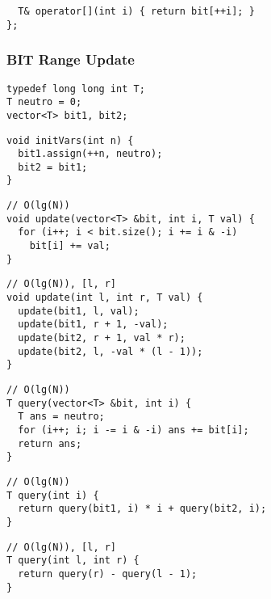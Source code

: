 \documentclass[twoside]{article}
\begin{document}
\begin{multicols*}{2}
\begin{verbatim}
  T& operator[](int i) { return bit[++i]; }
};
\end{verbatim}

\subsubsectionfont{\large\bfseries\sffamily\underline}
\subsubsection*{BIT Range Update}
\begin{verbatim}
typedef long long int T;
T neutro = 0;
vector<T> bit1, bit2;
\end{verbatim}
\vspace{-12pt}
\begin{verbatim}
void initVars(int n) {
  bit1.assign(++n, neutro);
  bit2 = bit1;
}
\end{verbatim}
\vspace{-12pt}
\begin{verbatim}
// O(lg(N))
void update(vector<T> &bit, int i, T val) {
  for (i++; i < bit.size(); i += i & -i)
    bit[i] += val;
}
\end{verbatim}
\vspace{-12pt}
\begin{verbatim}
// O(lg(N)), [l, r]
void update(int l, int r, T val) {
  update(bit1, l, val);
  update(bit1, r + 1, -val);
  update(bit2, r + 1, val * r);
  update(bit2, l, -val * (l - 1));
}
\end{verbatim}
\vspace{-12pt}
\begin{verbatim}
// O(lg(N))
T query(vector<T> &bit, int i) {
  T ans = neutro;
  for (i++; i; i -= i & -i) ans += bit[i];
  return ans;
}
\end{verbatim}
\vspace{-12pt}
\begin{verbatim}
// O(lg(N))
T query(int i) {
  return query(bit1, i) * i + query(bit2, i);
}
\end{verbatim}
\vspace{-12pt}
\begin{verbatim}
// O(lg(N)), [l, r]
T query(int l, int r) {
  return query(r) - query(l - 1);
}
\end{verbatim}

\subsubsectionfont{\large\bfseries\sffamily\underline}

\end{multicols*}
\end{document}
